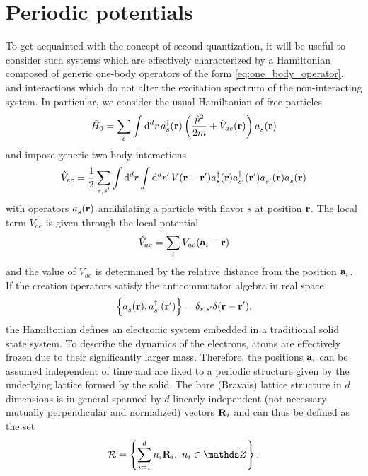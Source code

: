\section{Periodic potentials}
\label{sec:periodic_potentials}
To get acquainted with the concept of second quantization, it will be useful to consider such systems which are effectively characterized by a Hamiltonian composed of generic one-body operators of the form \cref{eq:one_body_operator}, and interactions which do not alter the excitation spectrum of the non-interacting system.
In particular, we consider the usual Hamiltonian of free particles
\begin{align}
    \hat H_0 = \sum_s\int\rd^d r\, a^\dag_s({\bf r})\brlr{\frac{\hat p^2}{2m}+ \hat V_{ae}({\bf r})}a_s^\pdag({\bf r})
\end{align}
and impose generic two-body interactions
\begin{align}
    \hat V_{ee} = \frac12\sum_{s,s'}\int\rd^dr\int\rd^dr'\,V({\bf r}-{\bf r'})a^\dag_s({\bf r})a^\dag_{s'}({\bf r'})a^\pdag_{s'}({\bf r})a^\pdag_{s}({\bf r})
\end{align}
with operators $a^\pdag_s({\bf r})$ annihilating a particle with flavor $s$ at position $\bf r$.
The local term $V_{ae}$ is given through the local potential
\begin{align}
    \hat V_{ae} = \sum_{i}V_{ae}({\bf a}_i - {\bf r})
\end{align}
and the value of $V_{ae}$ is determined by the relative distance from the position ${\bf a}_i$.
If the creation operators satisfy the anticommutator algebra in real space
\begin{align}
    \anticommutator{a^\pdag_s({\bf r}),a^\dag_{s'}({\bf r'})}=\delta_{s,s'}\delta({\bf r}-{\bf r'}),
\end{align}
the Hamiltonian defines an electronic system embedded in a traditional solid state system.
To describe the dynamics of the electrons, atoms are effectively frozen due to their significantly larger mass.
Therefore, the positions ${\bf a}_i$ can be assumed independent of time and are fixed to a periodic structure given by the underlying lattice formed by the solid.
The bare (Bravais) lattice structure in $d$ dimensions is in general spanned by $d$ linearly independent (not necessary mutually perpendicular and normalized) vectors ${\bf R}_i$ and can thus be defined as the set
\begin{align}
    \mathcal{R} = \anticommutator{\sum_{i=1}^d n_i {\bf R}_i,\ n_i\in\mathds Z}.
\end{align}
